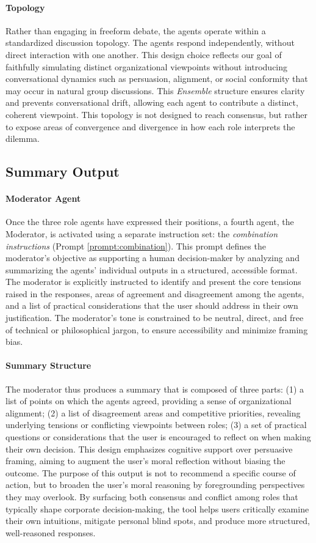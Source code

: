 \paragraph{Topology}{
  Rather than engaging in freeform debate, the agents operate within a standardized discussion topology. The agents respond independently, without direct interaction with one another. This design choice reflects our goal of faithfully simulating distinct organizational viewpoints without introducing conversational dynamics such as persuasion, alignment, or social conformity that may occur in natural group discussions. This \textit{Ensemble} structure ensures clarity and prevents conversational drift, allowing each agent to contribute a distinct, coherent viewpoint. This topology is not designed to reach consensus, but rather to expose areas of convergence and divergence in how each role interprets the dilemma.
}

\subsection{Summary Output}
\label{sec:summary}

\paragraph{Moderator Agent}{
  Once the three role agents have expressed their positions, a fourth agent, the Moderator, is activated using a separate instruction set: the \textit{combination instructions} (Prompt \ref{prompt:combination}). This prompt defines the moderator's objective as supporting a human decision-maker by analyzing and summarizing the agents' individual outputs in a structured, accessible format. The moderator is explicitly instructed to identify and present the core tensions raised in the responses, areas of agreement and disagreement among the agents, and a list of practical considerations that the user should address in their own justification. The moderator's tone is constrained to be neutral, direct, and free of technical or philosophical jargon, to ensure accessibility and minimize framing bias.
}

\paragraph{Summary Structure}
The moderator thus produces a summary that is composed of three parts: (1) a list of points on which the agents agreed, providing a sense of organizational alignment; (2) a list of disagreement areas and competitive priorities, revealing underlying tensions or conflicting viewpoints between roles; (3) a set of practical questions or considerations that the user is encouraged to reflect on when making their own decision.
This design emphasizes cognitive support over persuasive framing, aiming to augment the user's moral reflection without biasing the outcome.
The purpose of this output is not to recommend a specific course of action, but to broaden the user's moral reasoning by foregrounding perspectives they may overlook. By surfacing both consensus and conflict among roles that typically shape corporate decision-making, the tool helps users critically examine their own intuitions, mitigate personal blind spots, and produce more structured, well-reasoned responses.
